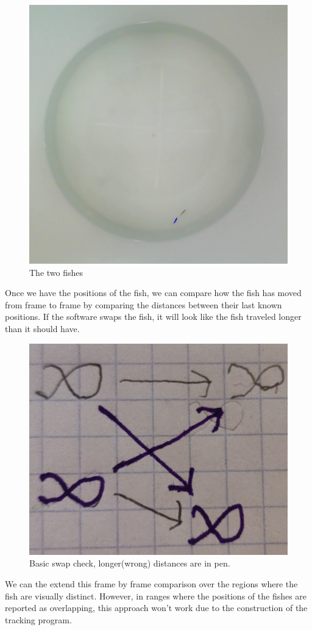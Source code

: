 \documentclass{article}
\begin{document}
\begin{figure}[H]
	\centering
	\includegraphics[width=.75\linewidth]{fish}
	\caption{The two fishes}
	\label{fig:fish}
\end{figure}

Once we have the positions of the fish, we can compare how the fish has moved from frame to frame by comparing the distances between their last known positions. If the software swaps the fish, it will look like the fish traveled longer than it should have.

\begin{figure}[H]
	\centering
	\includegraphics[width=.75\linewidth]{img1}
	\caption{Basic swap check, longer(wrong) distances are in pen.}
	\label{fig:matrix}
\end{figure}
We can the extend this frame by frame comparison over the regions where the fish are visually distinct. However, in ranges where the positions of the fishes are reported as overlapping, this approach won't work due to the construction of the tracking program. 
\end{document}
